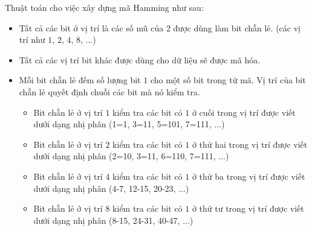 \documentclass[14pt]{extreport}
\begin{document}
Thuật toán cho việc xây dựng mã Hamming như sau:
\begin{itemize}
\item Tất cả các bit ở vị trí là các số mũ của 2 được dùng làm bit chẵn lẻ. (các vị trí như $1$, $2$, $4$, $8$, ...)
\item Tất cả các vị trí bit khác được dùng cho dữ liệu sẽ được mã hóa.
\item Mỗi bit chẵn lẻ đếm số lượng bit $1$ cho một số bit trong từ mã. Vị trí của bit chẵn lẻ quyết định chuỗi các bit mà nó kiểm tra.
\begin{itemize}
     \item Bit chẵn lẻ ở vị trí $1$ kiểm tra các bit có $1$ ở cuối trong vị trí được viết dưới dạng nhị phân (1=1, 3=11, 5=101, 7=111, ...) 
     \item Bit chẵn lẻ ở vị trí $2$ kiểm tra các bit có $1$ ở thứ hai trong vị trí được viết dưới dạng nhị phân (2=10, 3=11, 6=110, 7=111, ...)
     \item Bit chẵn lẻ ở vị trí $4$ kiểm tra các bit có $1$ ở thứ ba trong vị trí được viết dưới dạng nhị phân (4-7, 12-15, 20-23, ...)
     \item Bit chẵn lẻ ở vị trí $8$ kiểm tra các bit có $1$ ở thứ tư trong vị trí được viết dưới dạng nhị phân (8-15, 24-31, 40-47, ...)
\end{itemize}

\end{itemize}
\end{document}
